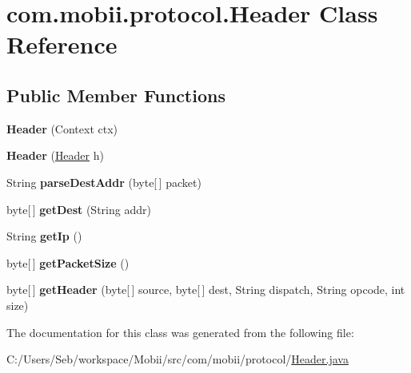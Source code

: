 \hypertarget{classcom_1_1mobii_1_1protocol_1_1_header}{\section{com.\-mobii.\-protocol.\-Header Class Reference}
\label{classcom_1_1mobii_1_1protocol_1_1_header}
}
\subsection*{Public Member Functions}
\begin{DoxyCompactItemize}
\item 
\hypertarget{classcom_1_1mobii_1_1protocol_1_1_header_aceec1f436ed1504b8f9abea04a93c621}{{\bfseries Header} (Context ctx)}\label{classcom_1_1mobii_1_1protocol_1_1_header_aceec1f436ed1504b8f9abea04a93c621}

\item 
\hypertarget{classcom_1_1mobii_1_1protocol_1_1_header_a814443faef92ae15b86a77792efafe6b}{{\bfseries Header} (\hyperlink{classcom_1_1mobii_1_1protocol_1_1_header}{Header} h)}\label{classcom_1_1mobii_1_1protocol_1_1_header_a814443faef92ae15b86a77792efafe6b}

\item 
\hypertarget{classcom_1_1mobii_1_1protocol_1_1_header_a94cee92d2b4f850c5eeae8b2b34f5452}{String {\bfseries parse\-Dest\-Addr} (byte\mbox{[}$\,$\mbox{]} packet)}\label{classcom_1_1mobii_1_1protocol_1_1_header_a94cee92d2b4f850c5eeae8b2b34f5452}

\item 
\hypertarget{classcom_1_1mobii_1_1protocol_1_1_header_a973da2cf12537a39f0b8f087844b031a}{byte\mbox{[}$\,$\mbox{]} {\bfseries get\-Dest} (String addr)}\label{classcom_1_1mobii_1_1protocol_1_1_header_a973da2cf12537a39f0b8f087844b031a}

\item 
\hypertarget{classcom_1_1mobii_1_1protocol_1_1_header_ab67981a641bcaae3e72971a82504418b}{String {\bfseries get\-Ip} ()}\label{classcom_1_1mobii_1_1protocol_1_1_header_ab67981a641bcaae3e72971a82504418b}

\item 
\hypertarget{classcom_1_1mobii_1_1protocol_1_1_header_a5ca109b0c2b6b923f4b4aa0f997fa61e}{byte\mbox{[}$\,$\mbox{]} {\bfseries get\-Packet\-Size} ()}\label{classcom_1_1mobii_1_1protocol_1_1_header_a5ca109b0c2b6b923f4b4aa0f997fa61e}

\item 
\hypertarget{classcom_1_1mobii_1_1protocol_1_1_header_a75884ebdb578b9636aeb305ae1476011}{byte\mbox{[}$\,$\mbox{]} {\bfseries get\-Header} (byte\mbox{[}$\,$\mbox{]} source, byte\mbox{[}$\,$\mbox{]} dest, String dispatch, String opcode, int size)}\label{classcom_1_1mobii_1_1protocol_1_1_header_a75884ebdb578b9636aeb305ae1476011}

\end{DoxyCompactItemize}


The documentation for this class was generated from the following file\-:\begin{DoxyCompactItemize}
\item 
C\-:/\-Users/\-Seb/workspace/\-Mobii/src/com/mobii/protocol/\hyperlink{_header_8java}{Header.\-java}\end{DoxyCompactItemize}
